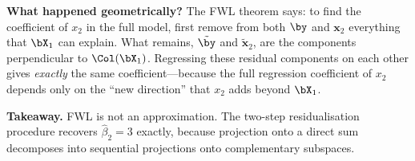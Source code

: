 \begin{example}
\medskip\noindent\textbf{What happened geometrically?}
The FWL theorem says: to find the coefficient of $x_2$ in the full model,
first remove from both $\by$ and $\bm{x}_2$ everything that $\bX_1$ can explain.
What remains, $\tilde{\by}$ and $\tilde{\bm{x}}_2$, are the components
perpendicular to $\Col(\bX_1)$.
Regressing these residual components on each other gives \emph{exactly}
the same coefficient---because the full regression coefficient of $x_2$
depends only on the ``new direction'' that $x_2$ adds beyond $\bX_1$.

\medskip\noindent\textbf{Takeaway.}
FWL is not an approximation. The two-step residualisation procedure
recovers $\hat\beta_2 = 3$ exactly, because projection onto a direct sum
decomposes into sequential projections onto complementary subspaces.
\end{example}


